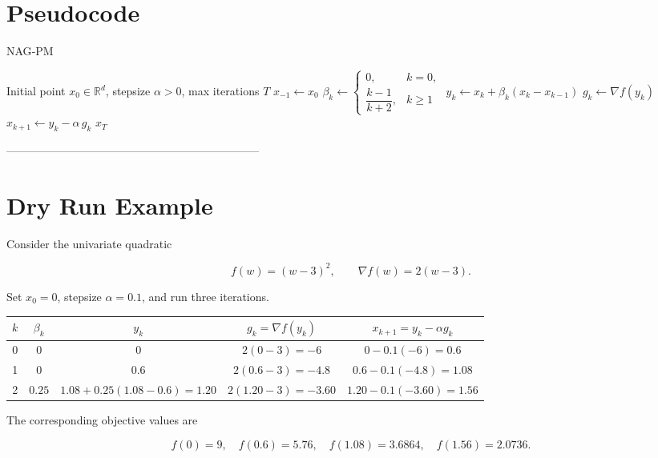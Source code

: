 \documentclass[11pt]{article}
\newcommand{\R}{\mathbb{R}}
\begin{document}
\section*{Pseudocode}
\begin{algorithm}[H]
\caption{NAG‑PM}
\begin{algorithmic}[1]
\Require Initial point $x_0\in\R^{d}$, stepsize $\alpha>0$, max iterations $T$
\State $x_{-1}\gets x_0$ 
    \State $\beta_k \gets
    \begin{cases}
        0, & k=0,\\[1mm]
        \dfrac{k-1}{k+2}, & k\ge 1
    \end{cases}$ 
    \State $y_k \gets x_k + \beta_k (x_k - x_{k-1})$ 
    \State $g_k \gets \nabla f(y_k)$ 
    \State $x_{k+1} \gets y_k - \alpha\, g_k$ 
\EndFor
\State \Return $x_T$
\end{algorithmic}
\end{algorithm}

--------------------------------------------------------------------

\section*{Dry Run Example}
Consider the univariate quadratic  

\[
f(w)=(w-3)^2,\qquad \nabla f(w)=2(w-3).
\]

Set $x_0=0$, stepsize $\alpha=0.1$, and run three iterations.

\begin{center}
\begin{tabular}{c|c|c|c|c}
$k$ & $\beta_k$ & $y_k$ & $g_k=\nabla f(y_k)$ & $x_{k+1}=y_k-\alpha g_k$ \\ \hline
0 & $0$ & $0$ & $2(0-3)=-6$ & $0-0.1(-6)=0.6$ \\[2mm]
1 & $0$ & $0.6$ & $2(0.6-3)=-4.8$ & $0.6-0.1(-4.8)=1.08$ \\[2mm]
2 & $0.25$ & $1.08+0.25(1.08-0.6)=1.20$ & $2(1.20-3)=-3.60$ & $1.20-0.1(-3.60)=1.56$
\end{tabular}
\end{center}

The corresponding objective values are  

\[
f(0)=9,\quad f(0.6)=5.76,\quad f(1.08)=3.6864,\quad f(1.56)=2.0736.
\]
\end{document}
